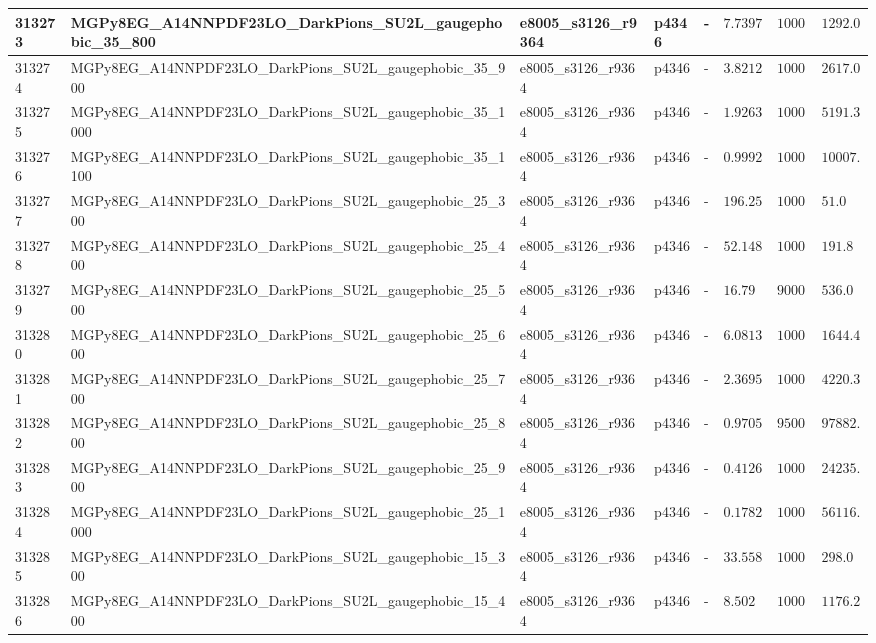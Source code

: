 \begin{table}[!hbtp]
{\begin{tabular}{llllllll}
    \hline
    313273 & MGPy8EG\_A14NNPDF23LO\_DarkPions\_SU2L\_gaugephobic\_35\_800 & e8005\_s3126\_r9364 & p4346 & - & $7.7397$ & $10000$ & $1292.0$\\
    \hline
    313274 & MGPy8EG\_A14NNPDF23LO\_DarkPions\_SU2L\_gaugephobic\_35\_900 & e8005\_s3126\_r9364 & p4346 & - & $3.8212$ & $10000$ & $2617.0$\\
    \hline
    313275 & MGPy8EG\_A14NNPDF23LO\_DarkPions\_SU2L\_gaugephobic\_35\_1000 & e8005\_s3126\_r9364 & p4346 & - & $1.9263$ & $10000$ & $5191.3$\\
    \hline
    313276 & MGPy8EG\_A14NNPDF23LO\_DarkPions\_SU2L\_gaugephobic\_35\_1100 & e8005\_s3126\_r9364 & p4346 & - & $0.99927$ & $10000$ & $10007.3$\\
    \hline
    313277 & MGPy8EG\_A14NNPDF23LO\_DarkPions\_SU2L\_gaugephobic\_25\_300 & e8005\_s3126\_r9364 & p4346 & - & $196.25$ & $10000$ & $51.0$\\
    \hline
    313278 & MGPy8EG\_A14NNPDF23LO\_DarkPions\_SU2L\_gaugephobic\_25\_400 & e8005\_s3126\_r9364 & p4346 & - & $52.148$ & $10000$ & $191.8$\\
    \hline
    313279 & MGPy8EG\_A14NNPDF23LO\_DarkPions\_SU2L\_gaugephobic\_25\_500 & e8005\_s3126\_r9364 & p4346 & - & $16.79$ & $9000$ & $536.0$\\
    \hline
    313280 & MGPy8EG\_A14NNPDF23LO\_DarkPions\_SU2L\_gaugephobic\_25\_600 & e8005\_s3126\_r9364 & p4346 & - & $6.0813$ & $10000$ & $1644.4$\\
    \hline
    313281 & MGPy8EG\_A14NNPDF23LO\_DarkPions\_SU2L\_gaugephobic\_25\_700 & e8005\_s3126\_r9364 & p4346 & - & $2.3695$ & $10000$ & $4220.3$\\
    \hline
    313282 & MGPy8EG\_A14NNPDF23LO\_DarkPions\_SU2L\_gaugephobic\_25\_800 & e8005\_s3126\_r9364 & p4346 & - & $0.97055$ & $95000$ & $97882.6$\\
    \hline
    313283 & MGPy8EG\_A14NNPDF23LO\_DarkPions\_SU2L\_gaugephobic\_25\_900 & e8005\_s3126\_r9364 & p4346 & - & $0.41262$ & $10000$ & $24235.4$\\
    \hline
    313284 & MGPy8EG\_A14NNPDF23LO\_DarkPions\_SU2L\_gaugephobic\_25\_1000 & e8005\_s3126\_r9364 & p4346 & - & $0.1782$ & $10000$ & $56116.7$\\
    \hline
    313285 & MGPy8EG\_A14NNPDF23LO\_DarkPions\_SU2L\_gaugephobic\_15\_300 & e8005\_s3126\_r9364 & p4346 & - & $33.558$ & $10000$ & $298.0$\\
    \hline
    313286 & MGPy8EG\_A14NNPDF23LO\_DarkPions\_SU2L\_gaugephobic\_15\_400 & e8005\_s3126\_r9364 & p4346 & - & $8.502$ & $10000$ & $1176.2$\\

\end{tabular}}
\end{table}

